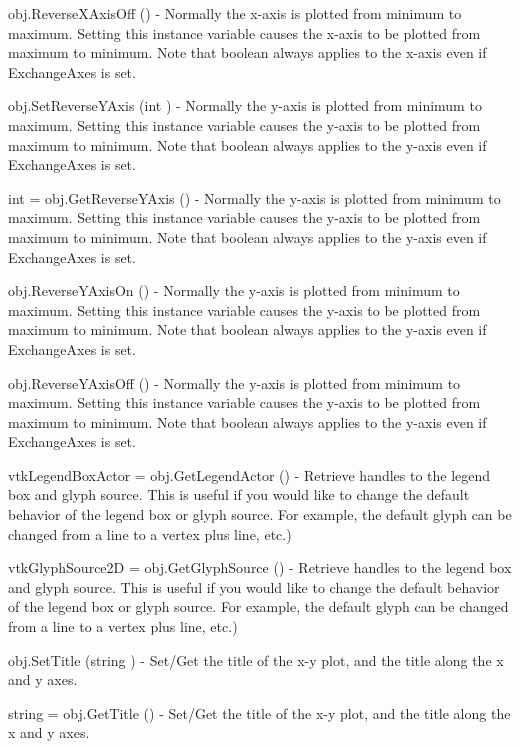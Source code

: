 \begin{DoxyItemize}
\item {\ttfamily obj.\-Reverse\-X\-Axis\-Off ()} -\/ Normally the x-\/axis is plotted from minimum to maximum. Setting this instance variable causes the x-\/axis to be plotted from maximum to minimum. Note that boolean always applies to the x-\/axis even if Exchange\-Axes is set.  
\item {\ttfamily obj.\-Set\-Reverse\-Y\-Axis (int )} -\/ Normally the y-\/axis is plotted from minimum to maximum. Setting this instance variable causes the y-\/axis to be plotted from maximum to minimum. Note that boolean always applies to the y-\/axis even if Exchange\-Axes is set.  
\item {\ttfamily int = obj.\-Get\-Reverse\-Y\-Axis ()} -\/ Normally the y-\/axis is plotted from minimum to maximum. Setting this instance variable causes the y-\/axis to be plotted from maximum to minimum. Note that boolean always applies to the y-\/axis even if Exchange\-Axes is set.  
\item {\ttfamily obj.\-Reverse\-Y\-Axis\-On ()} -\/ Normally the y-\/axis is plotted from minimum to maximum. Setting this instance variable causes the y-\/axis to be plotted from maximum to minimum. Note that boolean always applies to the y-\/axis even if Exchange\-Axes is set.  
\item {\ttfamily obj.\-Reverse\-Y\-Axis\-Off ()} -\/ Normally the y-\/axis is plotted from minimum to maximum. Setting this instance variable causes the y-\/axis to be plotted from maximum to minimum. Note that boolean always applies to the y-\/axis even if Exchange\-Axes is set.  
\item {\ttfamily vtk\-Legend\-Box\-Actor = obj.\-Get\-Legend\-Actor ()} -\/ Retrieve handles to the legend box and glyph source. This is useful if you would like to change the default behavior of the legend box or glyph source. For example, the default glyph can be changed from a line to a vertex plus line, etc.)  
\item {\ttfamily vtk\-Glyph\-Source2\-D = obj.\-Get\-Glyph\-Source ()} -\/ Retrieve handles to the legend box and glyph source. This is useful if you would like to change the default behavior of the legend box or glyph source. For example, the default glyph can be changed from a line to a vertex plus line, etc.)  
\item {\ttfamily obj.\-Set\-Title (string )} -\/ Set/\-Get the title of the x-\/y plot, and the title along the x and y axes.  
\item {\ttfamily string = obj.\-Get\-Title ()} -\/ Set/\-Get the title of the x-\/y plot, and the title along the x and y axes.  

\end{DoxyItemize}
